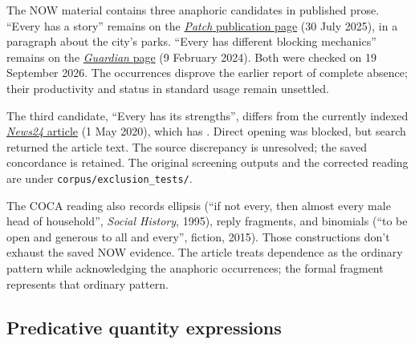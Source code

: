 \documentclass[12pt]{article}
\begin{document}
The NOW material contains three anaphoric candidates in published prose. \enquote{Every has a story} remains on the \href{https://patch.com/california/temecula/attention-detail-monument-refresh-underway-across-all-temecula-city-parks}{\textit{Patch} publication page} (30 July 2025), in a paragraph about the city's parks. \enquote{Every has different blocking mechanics} remains on the \href{https://www.theguardian.com/sport/2024/feb/09/super-bowl-chiefs-49ers-travis-kelce-tony-romo}{\textit{Guardian} page} (9 February 2024). Both were checked on 19 September 2026. The occurrences disprove the earlier report of complete absence; their productivity and status in standard usage remain unsettled.

The third candidate, \enquote{Every has its strengths}, differs from the currently indexed \href{https://www.news24.com/life/motoring/new-models/toyota-launches-new-corolla-in-sa-why-it-took-so-long-for-the-car-to-be-introduced-20200501-2}{\textit{News24} article} (1 May 2020), which has . Direct opening was blocked, but search returned the article text. The source discrepancy is unresolved; the saved concordance is retained. The original screening outputs and the corrected reading are under \texttt{corpus/exclusion\_tests/}.

The COCA reading also records ellipsis (\enquote{if not every, then almost every male head of household}, \textit{Social History}, 1995), reply fragments, and binomials (\enquote{to be open and generous to all and every}, fiction, 2015). Those constructions don't exhaust the saved NOW evidence. The article treats dependence as the ordinary pattern while acknowledging the anaphoric occurrences; the formal fragment represents that ordinary pattern.

\subsection{Predicative quantity expressions}
\end{document}
